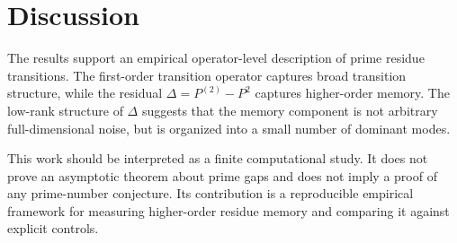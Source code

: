 \section{Discussion}

The results support an empirical operator-level description of prime residue transitions. The first-order transition operator captures broad transition structure, while the residual $\Delta=P^{(2)}-P^2$ captures higher-order memory. The low-rank structure of $\Delta$ suggests that the memory component is not arbitrary full-dimensional noise, but is organized into a small number of dominant modes.

This work should be interpreted as a finite computational study. It does not prove an asymptotic theorem about prime gaps and does not imply a proof of any prime-number conjecture. Its contribution is a reproducible empirical framework for measuring higher-order residue memory and comparing it against explicit controls.
